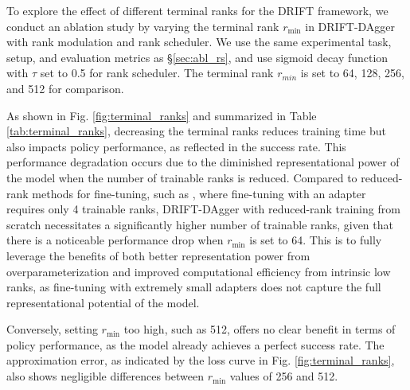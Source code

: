 To explore the effect of different terminal ranks for the DRIFT framework, we conduct an ablation study by varying the terminal rank $r_{\text{min}}$ in DRIFT-DAgger with rank modulation and rank scheduler. We use the same experimental task, setup, and evaluation metrics as \S\ref{sec:abl_rs}, and use sigmoid decay function with $\tau$ set to 0.5 for rank scheduler. The terminal rank $r_{min}$ is set to 64, 128, 256, and 512 for comparison.

As shown in Fig. \ref{fig:terminal_ranks} and summarized in Table \ref{tab:terminal_ranks}, decreasing the terminal ranks reduces training time but also impacts policy performance, as reflected in the success rate. This performance degradation occurs due to the diminished representational power of the model when the number of trainable ranks is reduced. Compared to reduced-rank methods for fine-tuning, such as \cite{hu_lora}, where fine-tuning with an adapter requires only 4 trainable ranks, DRIFT-DAgger with reduced-rank training from scratch necessitates a significantly higher number of trainable ranks, given that there is a noticeable performance drop when $r_{\text{min}}$ is set to 64. This is to fully leverage the benefits of both better representation power from overparameterization and improved computational efficiency from intrinsic low ranks, as fine-tuning with extremely small adapters does not capture the full representational potential of the model.

Conversely, setting $r_{\text{min}}$ too high, such as 512, offers no clear benefit in terms of policy performance, as the model already achieves a perfect success rate. The approximation error, as indicated by the loss curve in Fig. \ref{fig:terminal_ranks}, also shows negligible differences between $r_{\text{min}}$ values of 256 and 512.

